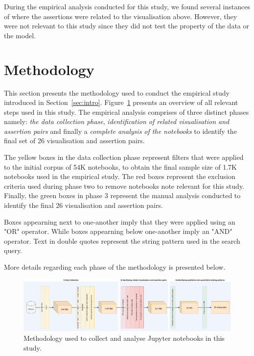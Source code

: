 \documentclass[acmsmall,screen,review,anonymous]{acmart}
\begin{document}

During the empirical analysis conducted for this study, we found several instances of where the assertions were related to the visualisation above. However, they were not relevant to this study since they did not test the property of the data or the model. 

\section{Methodology}\label{sec:method}
This section presents the methodology used to conduct the empirical study introduced in Section~\ref{sec:intro}. Figure~\ref{fig:method} presents an overview of all relevant steps used in this study. The empirical analysis comprises of three distinct phases namely: \textit{the data collection phase}, \textit{identification of related visualisation and assertion pairs} and finally a \textit{complete analysis of the notebooks} to identify the final set of 26 visualisation and assertion pairs.

The yellow boxes in the data collection phase represent filters that were applied to the initial corpus of 54K notebooks, to obtain the final sample size of 1.7K notebooks used in the empirical study. The red boxes represent the exclusion criteria used during phase two to remove notebooks note relevant for this study. Finally, the green boxes in phase 3 represent the manual analysis conducted to identify the final 26 visualisation and assertion pairs.

Boxes appearning next to one-another imply that they were applied using an "OR" operator. While boxes appearning below one-another imply an "AND" operator. Text in double quotes represent the string pattern used in the search query.

More details regarding each phase of the methodology is presented below.

\begin{figure}
  \centering
  \includegraphics[width=\textwidth]{method.pdf}
  \caption{Methodology used to collect and analyse Jupyter notebooks
    in this study.}
  \label{fig:method}
\end{figure}
\end{document}
